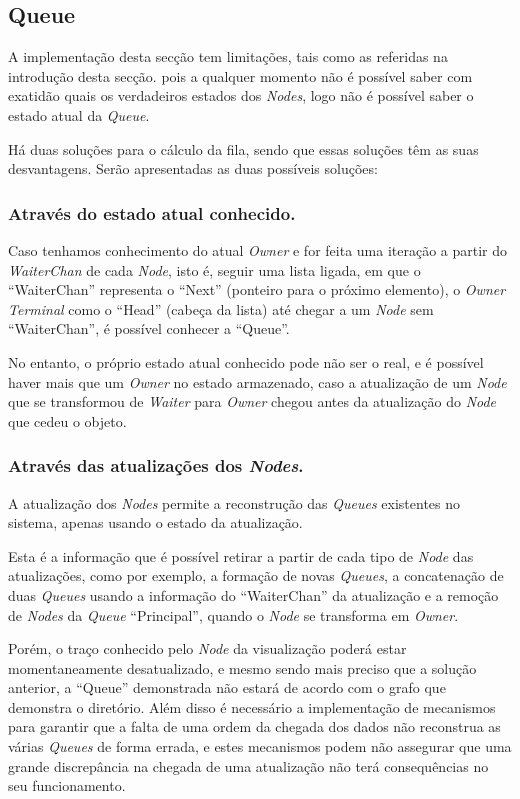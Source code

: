 \subsection*{Queue}
A implementação desta secção tem limitações, tais como as referidas na introdução desta secção.
pois a qualquer momento não é possível saber com exatidão quais os verdadeiros estados dos \emph{Nodes},
logo não é possível saber o estado atual da \emph{Queue}.

Há duas soluções para o cálculo da fila, sendo que essas soluções têm as suas desvantagens.
Serão apresentadas as duas possíveis soluções:


\subsubsection*{Através do estado atual conhecido.}

Caso tenhamos conhecimento do atual \emph{Owner} e for feita uma iteração a partir do \emph{WaiterChan} de cada \emph{Node}, isto é, seguir uma lista ligada, em que o ``WaiterChan'' representa o ``Next'' (ponteiro para o próximo elemento), o \emph{Owner Terminal} como o ``Head'' (cabeça da lista) até chegar a um \emph{Node} sem ``WaiterChan'', é possível conhecer a ``Queue''.

No entanto, o próprio estado atual conhecido pode não ser o real, e é possível haver mais que um \emph{Owner}
no estado armazenado, caso a atualização de um \emph{Node} que se transformou de \emph{Waiter} para \emph{Owner} chegou antes da atualização do \emph{Node} que cedeu o objeto.


\subsubsection*{Através das atualizações dos \emph{Nodes}.}

A atualização dos \emph{Nodes} permite a reconstrução das \emph{Queues} existentes no sistema, apenas usando o estado da atualização.

Esta é a informação que é possível retirar a partir de cada tipo de \emph{Node} das atualizações, como por exemplo, a formação de novas \emph{Queues}, a concatenação de duas \emph{Queues} usando a informação do ``WaiterChan'' da atualização e a remoção de \emph{Nodes} da \emph{Queue} ``Principal'', quando o \emph{Node} se transforma em \emph{Owner}.


Porém, o traço conhecido pelo \emph{Node} da visualização poderá estar momentaneamente desatualizado, e mesmo sendo mais preciso que a solução anterior, a ``Queue'' demonstrada não estará de acordo com o grafo que demonstra o diretório. Além disso é necessário a implementação de mecanismos para garantir que a falta de uma ordem da chegada dos dados não reconstrua as várias \emph{Queues} de forma errada, e estes mecanismos podem não assegurar que uma grande discrepância na chegada de uma atualização não terá consequências no seu funcionamento.\\


